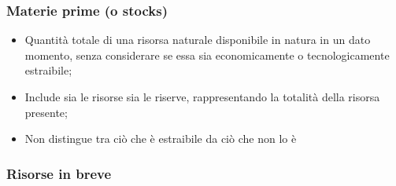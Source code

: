 \documentclass{article}
\begin{document}
\subsubsection{Materie prime (o stocks)}
\begin{itemize}
    \item Quantità totale di una risorsa naturale disponibile in natura in un dato momento,
        senza considerare se essa sia economicamente o tecnologicamente estraibile;
    \item Include sia le risorse sia le riserve, rappresentando la totalità della risorsa
        presente;
    \item Non distingue tra ciò che è estraibile da ciò che non lo è
\end{itemize}

\subsubsection{Risorse in breve}
\end{document}

